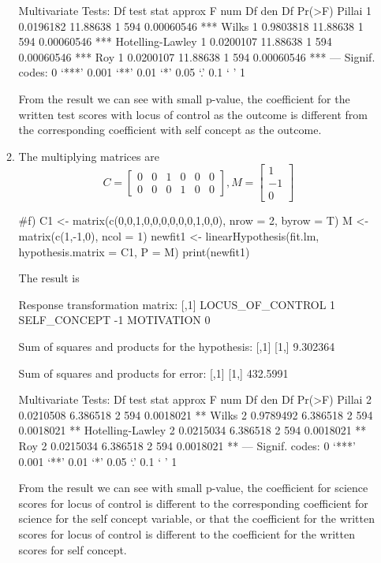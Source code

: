 \documentclass{article}
\begin{document}
\begin{enumerate}[leftmargin = 0 em, label = \arabic*., font = \bfseries]
\begin{enumerate}
\begin{rcode}
Multivariate Tests: 
                 Df test stat approx F num Df den Df     Pr(>F)    
Pillai            1 0.0196182 11.88638      1    594 0.00060546 ***
Wilks             1 0.9803818 11.88638      1    594 0.00060546 ***
Hotelling-Lawley  1 0.0200107 11.88638      1    594 0.00060546 ***
Roy               1 0.0200107 11.88638      1    594 0.00060546 ***
---
Signif. codes:  0 ‘***’ 0.001 ‘**’ 0.01 ‘*’ 0.05 ‘.’ 0.1 ‘ ’ 1
\end{rcode}
From the result we can see with small p-value, the coefficient for the written test scores with locus of control as the outcome
is different from the corresponding coefficient with self concept as the outcome.


\item 
The multiplying matrices are
\[C = \begin{bmatrix}
	0 & 0 & 1 & 0 & 0 & 0\\
	0 & 0 & 0 & 1 & 0 & 0
\end{bmatrix}, M = \begin{bmatrix}
	1 \\
	-1 \\
	0
\end{bmatrix}\]
\begin{rcode}
#f)
C1 <- matrix(c(0,0,1,0,0,0,0,0,0,1,0,0), nrow = 2, byrow = T)
M <- matrix(c(1,-1,0), ncol = 1)
newfit1 <- linearHypothesis(fit.lm, hypothesis.matrix = C1, P = M)
print(newfit1)
\end{rcode}
The result is
\begin{rcode}
 Response transformation matrix:
                 [,1]
LOCUS_OF_CONTROL    1
SELF_CONCEPT       -1
MOTIVATION          0

Sum of squares and products for the hypothesis:
         [,1]
[1,] 9.302364

Sum of squares and products for error:
         [,1]
[1,] 432.5991

Multivariate Tests: 
                 Df test stat approx F num Df den Df    Pr(>F)   
Pillai            2 0.0210508 6.386518      2    594 0.0018021 **
Wilks             2 0.9789492 6.386518      2    594 0.0018021 **
Hotelling-Lawley  2 0.0215034 6.386518      2    594 0.0018021 **
Roy               2 0.0215034 6.386518      2    594 0.0018021 **
---
Signif. codes:  0 ‘***’ 0.001 ‘**’ 0.01 ‘*’ 0.05 ‘.’ 0.1 ‘ ’ 1
\end{rcode}
From the result we can see with small p-value, the coefficient for science scores for locus of control is different to the
corresponding coefficient for science for the self concept variable, or that the coefficient for the written
scores for locus of control is different to the coefficient for the written scores for self concept.



\end{enumerate}
\end{enumerate}
\end{document}
